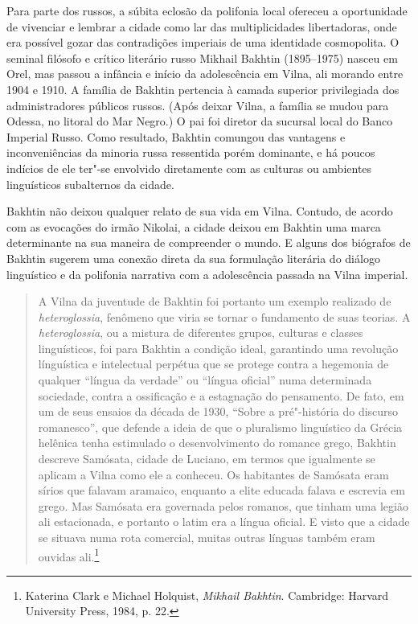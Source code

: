Para parte dos russos, a súbita eclosão da polifonia local ofereceu a
oportunidade de vivenciar e lembrar a cidade como lar das
multiplicidades libertadoras, onde era possível gozar das contradições
imperiais de uma identidade cosmopolita. O seminal filósofo e crítico
literário russo Mikhail Bakhtin (1895--1975) nasceu em Orel, mas passou a
infância e início da adolescência em Vilna, ali morando entre 1904 e
1910. A família de Bakhtin pertencia à camada superior privilegiada dos
administradores públicos russos. (Após deixar Vilna, a família se mudou
para Odessa, no litoral do Mar Negro.) O pai foi diretor da sucursal
local do Banco Imperial Russo. Como resultado, Bakhtin comungou das
vantagens e inconveniências da minoria russa ressentida porém
dominante, e há poucos indícios de ele ter"-se envolvido diretamente com
as culturas ou ambientes linguísticos subalternos da cidade.

Bakhtin não deixou qualquer relato de sua vida em Vilna. Contudo, de
acordo com as evocações do irmão Nikolai, a cidade deixou em Bakhtin uma
marca determinante na sua maneira de compreender o mundo. E alguns dos
biógrafos de Bakhtin sugerem uma conexão direta da sua formulação
literária do diálogo linguístico e da polifonia narrativa com a
adolescência passada na Vilna imperial.

\begin{quote}
A Vilna da juventude de Bakhtin foi portanto um exemplo realizado de
\textit{heteroglossia}, fenômeno que viria se tornar o fundamento de suas
teorias. A \textit{heteroglossia}, ou a mistura de diferentes grupos, culturas e
classes linguísticos, foi para Bakhtin a condição ideal, garantindo uma
revolução línguística e intelectual perpétua que se protege contra a
hegemonia de qualquer ``língua da verdade'' ou ``língua oficial'' numa
determinada sociedade, contra a ossificação e a estagnação do
pensamento. De fato, em um de seus ensaios da década de 1930, ``Sobre a
pré"-história do discurso romanesco'', que defende a ideia de que o
pluralismo linguístico da Grécia helênica tenha estimulado o
desenvolvimento do romance grego, Bakhtin descreve Samósata, cidade de
Luciano, em termos que igualmente se aplicam a Vilna como ele a
conheceu. Os habitantes de Samósata eram sírios que falavam aramaico,
enquanto a elite educada falava e escrevia em grego. Mas Samósata era
governada pelos romanos, que tinham uma legião ali estacionada, e
portanto o latim era a língua oficial. E visto que a cidade se situava
numa rota comercial, muitas outras línguas também eram ouvidas
ali.\footnote{Katerina Clark e Michael Holquist, \textit{Mikhail Bakhtin}. Cambridge: Harvard University Press, 1984, p. 22.} 
\end{quote}

